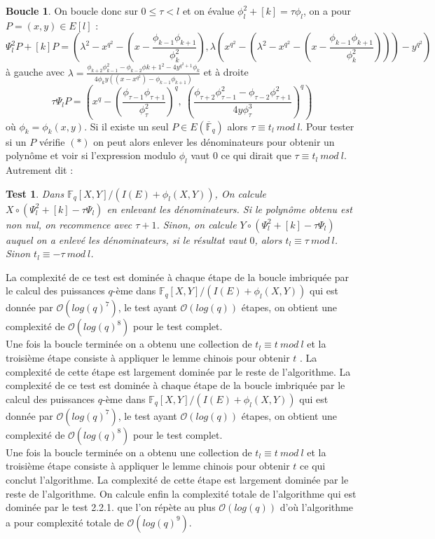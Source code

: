 \documentclass{article}
\theoremstyle{definition}
\newtheorem{boucle}[subsection]{Boucle}
\theoremstyle{plain}
\newtheorem{test}[subsubsection]{Test}
\begin{document}
\begin{boucle} On boucle donc sur $0\leq\tau<l$ et on évalue $\phi_l^2+[k]=\tau\phi_l$, on a pour $P=(x,y)\in E[l]$ : $$\Psi_l^2P+[k]P=\left(\lambda^2-x^{q^2}-\left(x-\frac{\phi_{k-1}\phi_{k+1}}{\phi_k^2}\right), \lambda\left(x^{q^2}-\left(\lambda^2-x^{q^2}-\left(x-\frac{\phi_{k-1}\phi_{k+1}}{\phi_k^2}\right)\right)\right)-y^{q^2}\right)$$à gauche avec $\lambda=\frac{\phi_{k+2}\phi_{k-1}^2-\phi_{k-2}\phi{k+1}^2-4y^{q^2+1}\phi_{k}}{4\phi_ky\left((x-x^{q^2})-\phi_{k-1}\phi_{k+1}\right)}$ et à droite $$\tau\Psi_lP=\left(x^q-\left(\frac{\phi_{\tau-1}\phi_{\tau+1}}{\phi_{\tau}^2}\right)^q,~\left(\frac{\phi_{\tau+2}\phi_{\tau-1}^2-\phi_{\tau-2}\phi_{\tau+1}^2}{4y\phi_{\tau}^3} \right)^q\right)$$où $\phi_k=\phi_k(x,y)$. 
Si il existe un seul $P\in E(\overline{\mathbb{F}}_q)$ alors $\tau\equiv t_l~mod~l$. Pour tester si un $P$ vérifie $(*)$ on peut alors enlever les dénominateurs pour obtenir un polynôme et voir si l'expression modulo $\phi_l$ vaut $0$ ce qui dirait que $\tau\equiv t_l~mod~l$. Autrement dit :
\begin{test}
    Dans $\mathbb{F}_q[X,Y]/(I(E)+\phi_l(X,Y))$, On calcule $X\circ(\Psi_l^2+[k]-\tau\Psi_l)$ en enlevant les dénominateurs. Si le polynôme obtenu est non nul, on recommence avec $\tau+1$. Sinon, on calcule $Y\circ(\Psi_l^2+[k]-\tau\Psi_l)$ auquel on a enlevé les dénominateurs, si le résultat vaut $0$, alors $t_l\equiv\tau~mod~l$. Sinon $t_l\equiv -\tau~mod~l$.
\end{test}
La complexité de ce test est dominée à chaque étape de la boucle imbriquée par le calcul des puissances $q$-ème dans $\mathbb{F}_q[X,Y]/(I(E)+\phi_l(X,Y))$ qui est donnée par $\mathcal{O}(log(q)^7)$, le test ayant $\mathcal{O}(log(q))$ étapes, on obtient une complexité de $\mathcal{O}(log(q)^8)$ pour le test complet.\\ \indent Une fois la boucle terminée on a obtenu une collection de $t_l\equiv t~mod~l$ et la troisième étape consiste à appliquer le lemme chinois pour obtenir $t$ . La complexité de cette étape est largement dominée par le reste de l'algorithme. 
La complexité de ce test est dominée à chaque étape de la boucle imbriquée par le calcul des puissances $q$-ème dans $\mathbb{F}_q[X,Y]/(I(E)+\phi_l(X,Y))$ qui est donnée par $\mathcal{O}(log(q)^7)$, le test ayant $\mathcal{O}(log(q))$ étapes, on obtient une complexité de $\mathcal{O}(log(q)^8)$ pour le test complet.\\ \indent Une fois la boucle terminée on a obtenu une collection de $t_l\equiv t~mod~l$ et la troisième étape consiste à appliquer le lemme chinois pour obtenir $t$ ce qui conclut l'algorithme. La complexité de cette étape est largement dominée par le reste de l'algorithme. On calcule enfin la complexité totale de l'algorithme qui est dominée par le test 2.2.1. que l'on répète au plus $\mathcal{O}(log(q))$ d'où l'algorithme a pour complexité totale de $\mathcal{O}(log(q)^9)$.
\end{boucle}
\end{document}
